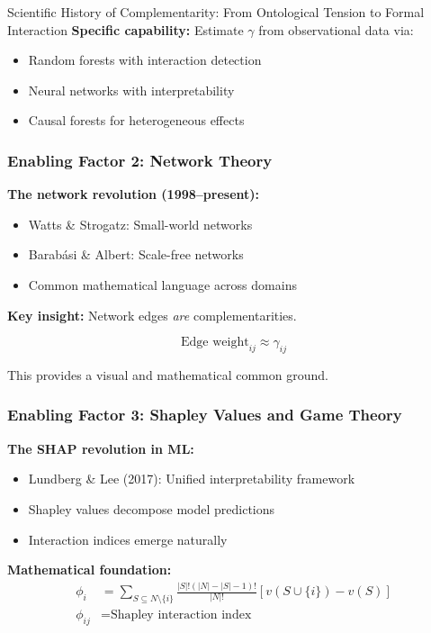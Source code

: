 \begin{chapter}{Scientific History of Complementarity: From Ontological Tension to Formal Interaction}
\textbf{Specific capability:} Estimate $\gamma$ from observational data via:
\begin{itemize}[noitemsep]
    \item Random forests with interaction detection
    \item Neural networks with interpretability
    \item Causal forests for heterogeneous effects
\end{itemize}

\subsubsection{Enabling Factor 2: Network Theory}

\textbf{The network revolution (1998--present):}
\begin{itemize}[noitemsep]
    \item Watts \& Strogatz: Small-world networks
    \item Barabási \& Albert: Scale-free networks
    \item Common mathematical language across domains
\end{itemize}

\textbf{Key insight:} Network edges \textit{are} complementarities.

\[
\text{Edge weight}_{ij} \approx \gamma_{ij}
\]

This provides a visual and mathematical common ground.

\subsubsection{Enabling Factor 3: Shapley Values and Game Theory}

\textbf{The SHAP revolution in ML:}
\begin{itemize}[noitemsep]
    \item Lundberg \& Lee (2017): Unified interpretability framework
    \item Shapley values decompose model predictions
    \item Interaction indices emerge naturally
\end{itemize}

\textbf{Mathematical foundation:}
\begin{align}
\phi_i &= \sum_{S \subseteq N \setminus \{i\}} \frac{|S|!(|N|-|S|-1)!}{|N|!} [v(S \cup \{i\}) - v(S)] \\
\phi_{ij} &= \text{Shapley interaction index}
\end{align}


\end{chapter}
